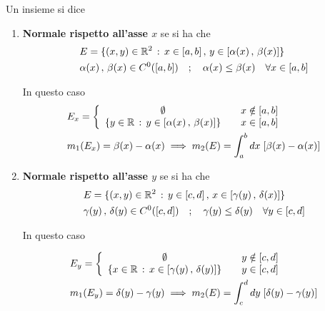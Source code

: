 Un insieme si dice
\begin{enumerate}
	\item \textbf{Normale rispetto all'asse $x$} se si ha che
	\begin{align}
		{}&E= \{ (x,y)\in \mathbb{R}^2 \, : \, x\in[a,b] \, , \, y \in [\alpha(x) \, , \, \beta(x)]   \}\\
		&\alpha(x) \, , \, \beta(x) \in C^0([a,b]) \quad ; \quad \alpha(x) \leq \beta(x) \quad \forall x \in [a,b]
	\end{align}
	\begin{figure}[!htb]
	\end{figure}
	
	In questo caso
	\begin{align}
		{}&E_x = \left\{\begin{array}{cc} \emptyset \quad {}& x \notin [a,b] \\ \{  y\in \mathbb{R} \, : \, y \in [\alpha(x) \, , \, \beta(x)]  \} \quad & x \in [a,b] \end{array}\right. \\
		& m_1(E_x) = \beta(x) - \alpha(x) \implies m_2(E) = \int_{a}^{b} dx \; [\beta(x) - \alpha(x)]
	\end{align}
	
\newpage	
	
	\item \textbf{Normale rispetto all'asse $y$} se si ha che
	\begin{align}
		{}&E= \{ (x,y)\in \mathbb{R}^2 \, : \, y\in[c,d] \, , \, x \in [\gamma(y) \, , \, \delta(x)]   \}\\
		&\gamma(y) \, , \, \delta(y) \in C^0([c,d]) \quad ; \quad \gamma(y) \leq \delta(y) \quad \forall y \in [c,d]
	\end{align}
	\begin{figure}[!htb]
	\end{figure}
	In questo caso
	
	\begin{align}
		{}&E_y = \left\{\begin{array}{cc} \emptyset \quad {}& y \notin [c,d] \\ \{  x\in \mathbb{R} \, : \, x \in [\gamma(y) \, , \, \delta(y)]  \} \quad & y \in [c,d] \end{array}\right. \\
		& m_1(E_y) = \delta(y) - \gamma(y) \implies m_2(E) = \int_{c}^{d} dy \; [\delta(y) - \gamma(y)]
	\end{align}
\end{enumerate}

